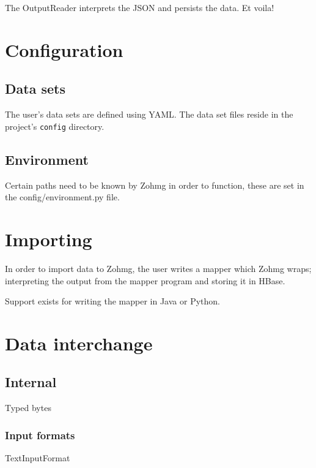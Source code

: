 \documentclass[a4paper,10pt]{book}
\begin{document}
The OutputReader interprets the JSON and persists the data. Et voila!


\section{Configuration}

\subsection{Data sets}


The user's data sets are defined using YAML. The data set files reside in
the project's \texttt{config} directory.


\subsection{Environment}

Certain paths need to be known by Zohmg in order to function, these are set
in the config/environment.py file.



\section{Importing}

In order to import data to Zohmg, the user writes a mapper which Zohmg wraps;
interpreting the output from the mapper program and storing it in HBase.

Support exists for writing the mapper in Java or Python.



\section{Data interchange}

\subsection{Internal}

Typed bytes


\subsubsection{Input formats}

TextInputFormat
\end{document}
